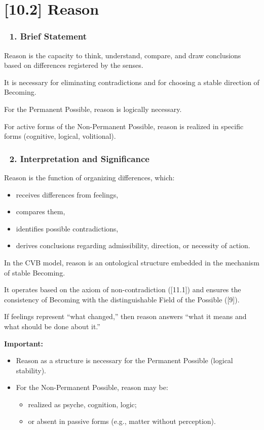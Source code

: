 \documentclass[12pt]{article}
\begin{document}
\section*{[10.2] Reason}

\subsubsection*{🔹 1. Brief Statement}
Reason is the capacity to think, understand, compare, and draw conclusions based on differences registered by the senses.

It is necessary for eliminating contradictions and for choosing a stable direction of Becoming.

For the Permanent Possible, reason is logically necessary.

For active forms of the Non-Permanent Possible, reason is realized in specific forms (cognitive, logical, volitional).

\subsubsection*{🔹 2. Interpretation and Significance}
Reason is the function of organizing differences, which:
\begin{itemize}
\item receives differences from feelings,
\item compares them,
\item identifies possible contradictions,
\item derives conclusions regarding admissibility, direction, or necessity of action.
\end{itemize}

In the CVB model, reason is an ontological structure embedded in the mechanism of stable Becoming.

It operates based on the axiom of non-contradiction ([11.1]) and ensures the consistency of Becoming with the distinguishable Field of the Possible ([9]).

If feelings represent ``what changed,'' then reason answers ``what it means and what should be done about it.''

\textbf{Important:}
\begin{itemize}
\item Reason as a structure is necessary for the Permanent Possible (logical stability).
\item For the Non-Permanent Possible, reason may be:
    \begin{itemize}
    \item realized as psyche, cognition, logic;
    \item or absent in passive forms (e.g., matter without perception).
    \end{itemize}
\end{itemize}
\end{document}

